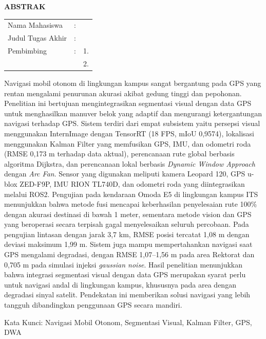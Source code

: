 \begin{center}
  \large\textbf{ABSTRAK}
\end{center}


\vspace{2ex}

\begingroup
\setlength{\tabcolsep}{0pt}

\noindent
\begin{tabularx}{\textwidth}{l >{\centering}m{2em} X}
  Nama Mahasiswa    & : & \name{}         \\

  Judul Tugas Akhir & : & \tatitle{}      \\

  Pembimbing        & : & 1. \advisor{}   \\
                    &   & 2. \coadvisor{} \\
\end{tabularx}
\endgroup

\begin{sloppypar}
Navigasi mobil otonom di lingkungan kampus sangat bergantung pada GPS yang rentan mengalami penurunan akurasi akibat gedung tinggi dan pepohonan.
Penelitian ini bertujuan mengintegrasikan segmentasi visual dengan data GPS untuk menghasilkan manuver belok yang adaptif dan mengurangi ketergantungan navigasi terhadap GPS.
Sistem terdiri dari empat subsistem yaitu persepsi visual menggunakan InternImage dengan TensorRT (18 FPS, mIoU 0,9574), lokalisasi menggunakan Kalman Filter yang memfusikan GPS, IMU, dan odometri roda (RMSE 0,173 m terhadap data aktual), perencanaan rute global berbasis algoritma Dijkstra, dan perencanaan lokal berbasis \emph{Dynamic Window Approach} dengan \emph{Arc Fan}.
Sensor yang digunakan meliputi kamera Leopard 120\textdegree, GPS u-blox ZED-F9P, IMU RION TL740D, dan odometri roda yang diintegrasikan melalui ROS2.
Pengujian pada kendaraan Omoda E5 di lingkungan kampus ITS menunjukkan bahwa metode fusi mencapai keberhasilan penyelesaian rute 100\% dengan akurasi destinasi di bawah 1 meter, sementara metode vision dan GPS yang beroperasi secara terpisah gagal menyelesaikan seluruh percobaan.
Pada pengujian lintasan dengan jarak 3,7 km, RMSE posisi tercatat 1,08 m dengan deviasi maksimum 1,99 m.
Sistem juga mampu mempertahankan navigasi saat GPS mengalami degradasi, dengan RMSE 1,07--1,56 m pada area Rektorat dan 0,705 m pada simulasi injeksi \emph{gaussian noise}.
Hasil penelitian menunjukkan bahwa integrasi segmentasi visual dengan data GPS merupakan syarat perlu untuk navigasi andal di lingkungan kampus, khususnya pada area dengan degradasi sinyal satelit.
Pendekatan ini memberikan solusi navigasi yang lebih tangguh dibandingkan penggunaan GPS secara mandiri.
\end{sloppypar}

Kata Kunci: Navigasi Mobil Otonom, Segmentasi Visual, Kalman Filter, GPS, DWA
